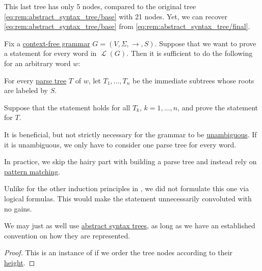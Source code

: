 \begin{remark}
  This last tree has only 5 nodes, compared to the original tree \eqref{eq:rem:abstract_syntax_tree/base} with 21 nodes. Yet, we can recover \eqref{eq:rem:abstract_syntax_tree/base} from \eqref{eq:rem:abstract_syntax_tree/final}.
\end{remark}

\begin{theorem}\label{thm:induction_on_syntax_trees}
  Fix a \hyperref[def:chomsky_hierarchy/context_free]{context-free grammar} \( G = (V, \Sigma, \to, S) \). Suppose that we want to prove a statement for every word in \( \mscrL(G) \). Then it is sufficient to do the following for an arbitrary word \( w \):
  \begin{displayquote}
    For every \hyperref[def:parse_tree]{parse tree} \( T \) of \( w \), let \( T_1, \ldots, T_n \) be the immediate subtrees whose roots are labeled by \( S \).

    Suppose that the statement holds for all \( T_k \), \( k = 1, \ldots, n \), and prove the statement for \( T \).
  \end{displayquote}
\end{theorem}
\begin{comments}
  \item It is beneficial, but not strictly necessary for the grammar to be \hyperref[def:grammar_ambiguity]{unambiguous}. If it is unambiguous, we only have to consider one parse tree for every word.
  \item In practice, we skip the hairy part with building a parse tree and instead rely on \hyperref[rem:evaluation]{pattern matching}.
  \item Unlike for the other induction principles in , we did not formulate this one via logical formulas. This would make the statement unnecessarily convoluted with no gains.
  \item We may just as well use \hyperref[rem:abstract_syntax_tree]{abstract syntax trees}, as long as we have an established convention on how they are represented.
\end{comments}
\begin{proof}
  This is an instance of  if we order the tree nodes according to their \hyperref[def:rooted_tree/height]{height}.
\end{proof}

